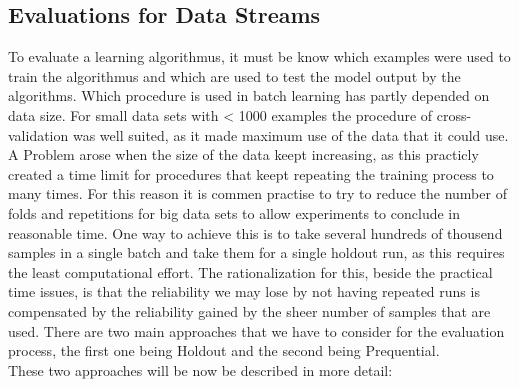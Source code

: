 \documentclass[12pt,oneside,a4paper,parskip]{scrbook}
\begin{document}
\subsection{Evaluations for Data Streams}
To evaluate a learning algorithmus, it must be know which examples were used to train the algorithmus and which are used to 
test the model output by the algorithms. Which procedure is used in batch learning has partly depended on data size.
For small data sets with < 1000 examples the procedure of cross-validation was well suited, as it made maximum use of the
data that it could use.
A Problem arose when the size of the data keept increasing, as this practicly created a time limit for procedures that keept
repeating the training process to many times.
For this reason it is commen practise to try to reduce the number of folds and repetitions for big data sets to allow experiments
to conclude in reasonable time. 
One way to achieve this is to take several hundreds of thousend samples in a single batch and take them for a single holdout run,
as this requires the least computational effort. The rationalization for this, beside the practical time issues, is that the 
reliability we may lose by not having repeated runs is compensated by the reliability gained by the sheer number of samples that are used. 
There are two main approaches that we have to consider for the evaluation process, the first one being Holdout and the second being 
Prequential. \cite{Bifet_datastream} \\
These two approaches will be now be described in more detail:
\end{document}
